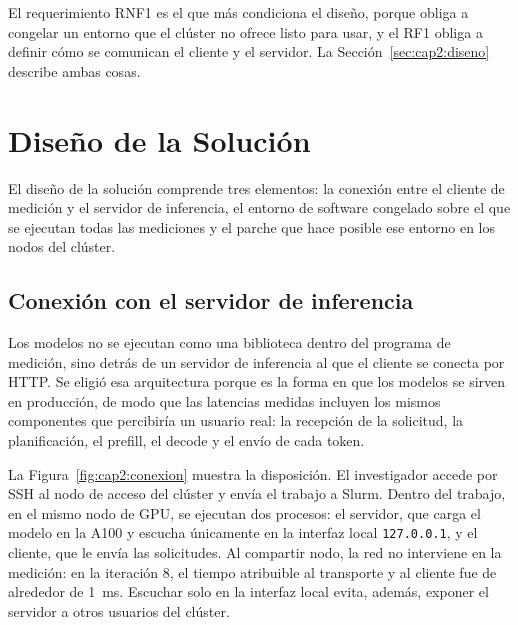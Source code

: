 El requerimiento RNF1 es el que más condiciona el diseño, porque obliga a congelar un entorno que el clúster no ofrece listo para usar, y el RF1 obliga a definir cómo se comunican el cliente y el servidor. La Sección~\ref{sec:cap2:diseno} describe ambas cosas.

\section{Diseño de la Solución}
\label{sec:diseno_solucion}
\label{sec:cap2:diseno}

El diseño de la solución comprende tres elementos: la conexión entre el cliente de medición y el servidor de inferencia, el entorno de software congelado sobre el que se ejecutan todas las mediciones y el parche que hace posible ese entorno en los nodos del clúster.

\subsection{Conexión con el servidor de inferencia}
\label{sec:cap2:conexion}

Los modelos no se ejecutan como una biblioteca dentro del programa de medición, sino detrás de un servidor de inferencia al que el cliente se conecta por HTTP. Se eligió esa arquitectura porque es la forma en que los modelos se sirven en producción, de modo que las latencias medidas incluyen los mismos componentes que percibiría un usuario real: la recepción de la solicitud, la planificación, el prefill, el decode y el envío de cada token.

La Figura~\ref{fig:cap2:conexion} muestra la disposición. El investigador accede por SSH al nodo de acceso del clúster y envía el trabajo a Slurm. Dentro del trabajo, en el mismo nodo de GPU, se ejecutan dos procesos: el servidor, que carga el modelo en la A100 y escucha únicamente en la interfaz local \texttt{127.0.0.1}, y el cliente, que le envía las solicitudes. Al compartir nodo, la red no interviene en la medición: en la iteración 8, el tiempo atribuible al transporte y al cliente fue de alrededor de 1~ms. Escuchar solo en la interfaz local evita, además, exponer el servidor a otros usuarios del clúster.

